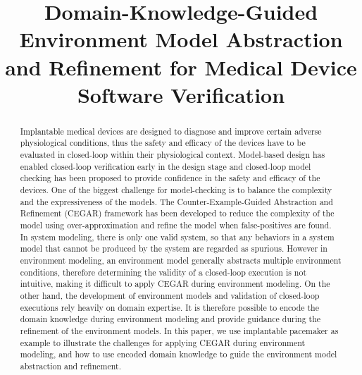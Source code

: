 \documentclass{llncs}
\title{Domain-Knowledge-Guided Environment Model Abstraction and Refinement for Medical Device Software Verification}
\begin{document}
\maketitle

\begin{abstract}
Implantable medical devices are designed to diagnose and improve certain adverse physiological conditions, thus the safety and efficacy of the devices have to be evaluated in closed-loop within their physiological context. Model-based design has enabled closed-loop verification early in the design stage and closed-loop model checking has been proposed to provide confidence in the safety and efficacy of the devices. One of the biggest challenge for model-checking is to balance the complexity and the expressiveness of the models. The Counter-Example-Guided Abstraction and Refinement (CEGAR) framework has been developed to reduce the complexity of the model using over-approximation and refine the model when false-positives are found. In system modeling, there is only one valid system, so that any behaviors in a system model that cannot be produced by the system are regarded as spurious. However in environment modeling, an environment model generally abstracts multiple environment conditions, therefore determining the validity of a closed-loop execution is not intuitive, making it difficult to apply CEGAR during environment modeling. On the other hand, the development of environment models and validation of closed-loop executions rely heavily on domain expertise. It is therefore possible to encode the domain knowledge during environment modeling and provide guidance during the refinement of the environment models. In this paper, we use implantable pacemaker as example to illustrate the challenges for applying CEGAR during environment modeling, and how to use encoded domain knowledge to guide the environment model abstraction and refinement.
\end{abstract}
\end{document}

